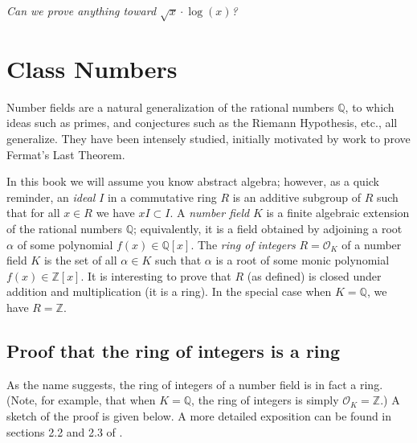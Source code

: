 \documentclass{book}
\theoremstyle{plain}
\theoremstyle{definition}
\numberwithin{equation}{section}
\numberwithin{figure}{section}
\numberwithin{table}{section}
\newcommand{\Q}{\mathbb{Q}}
\newcommand{\Z}{\mathbb{Z}}
\renewcommand{\O}{\mathcal{O}}
\newcommand{\hw}[2]{\par\vspace{1em}{\bf HW (#1):} {\em #2}\par\vspace{1em}}
\begin{document}
\hw{Andrew and Bharath}{Can we prove anything toward $\sqrt{x}\cdot \log(x)$?}

\section{Class Numbers}
Number fields are a natural generalization of the rational numbers $\Q$,
to which ideas such as primes, and conjectures such as
the Riemann Hypothesis, etc., all generalize.  They have
been intensely studied, initially motivated by
work to prove Fermat's Last Theorem.

In this book we will assume you know abstract algebra; however,
as a quick reminder, an {\em ideal} $I$ in a commutative ring $R$ is an additive subgroup of $R$ such that for all $x\in R$ we have $xI \subset I$.
A {\em number field} $K$ is a finite algebraic extension of
the rational numbers $\Q$; equivalently, it is a field obtained
by adjoining a root $\alpha$ of some polynomial $f(x) \in \Q[x]$.
The {\em ring of integers} $R=\O_K$ of a number field $K$ is the
set of all $\alpha\in K$ such that $\alpha$ is a root of some
monic polynomial $f(x)\in\Z[x]$.  It is interesting to prove
that $R$ (as defined) is closed under addition and multiplication
(it is a ring).
In the special case when $K=\Q$, we have $R=\Z$.

\subsection{Proof that the ring of integers is a ring}
As the name suggests, the ring of integers of a number field is in fact a ring.  (Note, for example, that when $K = \Q$, the ring of integers is simply $\O_K = \Z$.)  A sketch of the proof is given below.  A more detailed exposition can be found in sections 2.2 and 2.3 of \cite{stein:ant}.
\end{document}
